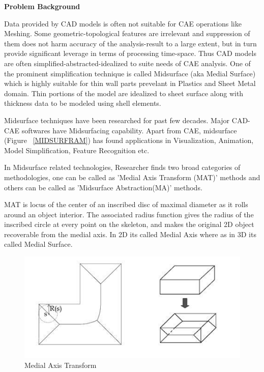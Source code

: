 \documentclass[a4paper]{article}
\begin{document}
\vskip5mm


\textbf{Problem Background}

Data provided by CAD models is often not suitable for CAE operations like Meshing. Some geometric-topological features are irrelevant and suppression of them does not harm accuracy of the analysis-result to a large extent, but in turn provide significant leverage in terms of processing time-space. Thus CAD models are often simplified-abstracted-idealized to suite needs of CAE analysis. One of the prominent simplification technique is called Midsurface (aka Medial Surface) which is highly suitable for thin wall parts prevelant in Plastics and Sheet Metal domain. Thin portions of the model are idealized to sheet surface along with thickness data to be modeled using shell elements. 

Midsurface techniques have been researched for past few decades. Major CAD-CAE softwares have Midsurfacing capability. Apart from CAE, midsurface (Figure ~\ref{MIDSURFRAM}) has found applications in Visualization, Animation, Model Simplification, Feature Recognition etc. 

In Midsurface related technologies, Researcher finds two broad categories of methodologies, one can be called as 'Medial Axis Transform (MAT)' methods and others can be called as 'Midsurface Abstraction(MA)' methods.

MAT is locus of the center of an inscribed disc of maximal diameter as it rolls around an object interior. The associated radius function gives the radius of the inscribed circle at every point on the skeleton, and makes the original 2D object recoverable from the medial axis. In 2D its called Medial Axis where as in 3D its called Medial Surface. 

\begin{figure}
\includegraphics[scale=0.6]{../Common/images/MAT.jpg}
\caption{Medial Axis Transform \cite{Sheen2007}}
\label{MAT}
\end{figure}
\end{document}
